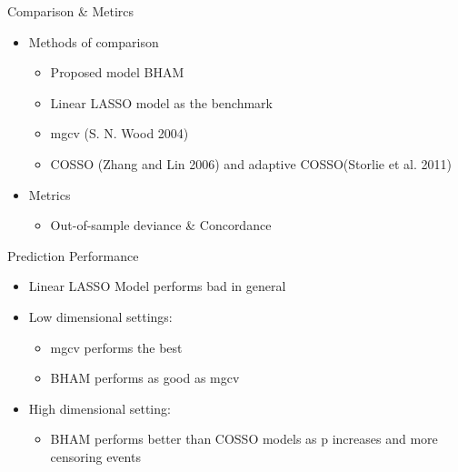 \documentclass[
  ignorenonframetext,
  aspectratio=169]{beamer}
\providecommand{\tightlist}{%
  \setlength{\itemsep}{0pt}\setlength{\parskip}{0pt}}
\begin{document}
\begin{frame}{Comparison \& Metircs}
\protect\hypertarget{comparison-metircs-1}{}
\begin{itemize}
\tightlist
\item
  Methods of comparison

  \begin{itemize}
  \tightlist
  \item
    Proposed model BHAM
  \item
    Linear LASSO model as the benchmark
  \item
    mgcv (S. N. Wood 2004)
  \item
    COSSO (Zhang and Lin 2006) and adaptive COSSO(Storlie et al. 2011)
  \end{itemize}
\item
  Metrics

  \begin{itemize}
  \tightlist
  \item
    Out-of-sample deviance \& Concordance
  \end{itemize}
\end{itemize}
\end{frame}

\begin{frame}{Prediction Performance}
\protect\hypertarget{prediction-performance-1}{}
\begin{itemize}
\tightlist
\item
  Linear LASSO Model performs bad in general
\item
  Low dimensional settings:

  \begin{itemize}
  \tightlist
  \item
    mgcv performs the best
  \item
    BHAM performs as good as mgcv
  \end{itemize}
\item
  High dimensional setting:

  \begin{itemize}
  \tightlist
  \item
    BHAM performs better than COSSO models as p increases and more
    censoring events
  \end{itemize}
\end{itemize}
\end{frame}
\end{document}
